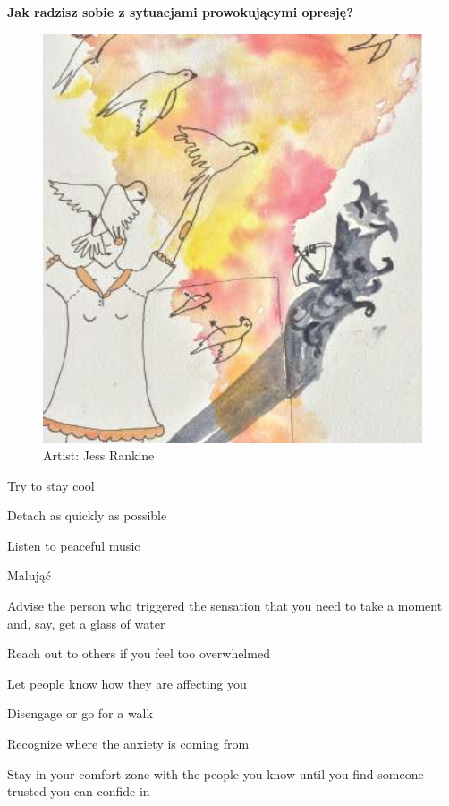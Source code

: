 \newpage
\noindent\textcolor{ProcessBlue}{\textbf{\Large{Jak radzisz sobie z sytuacjami prowokującymi opresję?}}}\\
\begin{figure}[h]
\centering
\includegraphics[width=17cm]{TeX_files/3-3.png}
\caption{Artist: Jess Rankine}
\label{3-3}
\end{figure}

\begin{checkboxlist}
\item Try to stay cool
\item Detach as quickly as possible
\item Listen to peaceful music
\item Malująć
\item Advise the person who triggered the sensation that you need to take a moment and, say, get a glass of water
\item Reach out to others if you feel too overwhelmed
\item Let people know how they are affecting you
\item Disengage or go for a walk
\item Recognize where the anxiety is coming from
\item Stay in your comfort zone with the people you know until you find someone trusted you can confide in
\end{checkboxlist}

